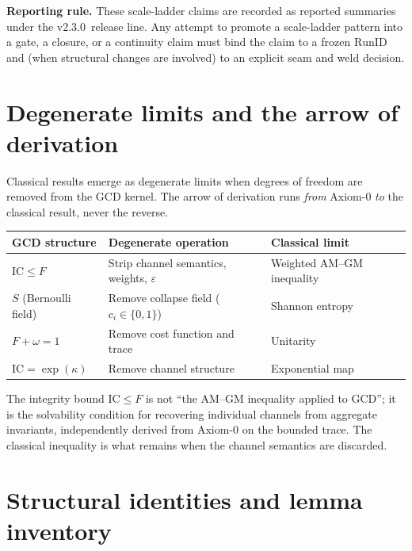 \documentclass[
  aps,
  prd,
  preprint,
  superscriptaddress,
  nofootinbib,
  floatfix
]{revtex4-2}
\newcommand{\IC}{\mathrm{IC}}
\newcommand{\ValidatorLine}{v2.3.0}
\begin{document}
\noindent\textbf{Reporting rule.}
These scale-ladder claims are recorded as reported summaries under the \ValidatorLine\ release line.
Any attempt to promote a scale-ladder pattern into a gate, a closure, or a continuity claim must bind the claim to a frozen
$\mathrm{RunID}$ and (when structural changes are involved) to an explicit seam and weld decision.

\section{Degenerate limits and the arrow of derivation}
\label{sec:degenerate}

Classical results emerge as degenerate limits when degrees of freedom are removed from the GCD kernel.
The arrow of derivation runs \emph{from} Axiom-0 \emph{to} the classical result, never the reverse.

\begin{center}
\begin{tabular}{@{}lll@{}}
\toprule
GCD structure & Degenerate operation & Classical limit \\
\midrule
$\IC \le F$ & Strip channel semantics, weights, $\varepsilon$ & Weighted AM--GM inequality \\
$S$ (Bernoulli field) & Remove collapse field ($c_i\in\{0,1\}$) & Shannon entropy \\
$F+\omega=1$ & Remove cost function and trace & Unitarity \\
$\IC=\exp(\kappa)$ & Remove channel structure & Exponential map \\
\bottomrule
\end{tabular}
\end{center}

\noindent The integrity bound $\IC\le F$ is not ``the AM--GM inequality applied to GCD'';
it is the solvability condition for recovering individual channels from aggregate invariants,
independently derived from Axiom-0 on the bounded trace.
The classical inequality is what remains when the channel semantics are discarded.

\section{Structural identities and lemma inventory}
\label{sec:identities}
\end{document}
